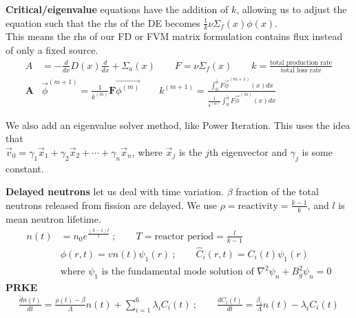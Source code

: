 \documentclass[12pt]{article}
\newcommand{\ve}[1]{\ensuremath{\mathbf{#1}}}
\begin{document}
\textbf{Critical/eigenvalue} equations have the addition of $k$, allowing us to adjust the equation such that the rhs of the DE becomes $\frac{1}{k}\nu \Sigma_f(x) \phi(x)$. \\
This means the rhs of our FD or FVM matrix formulation contains flux instead of only a fixed source. 
\vspace*{-1.25em}
\begin{align*}
A &= -\frac{d}{dx}D(x)\frac{d}{dx} + \Sigma_a(x) \qquad F = \nu\Sigma_f(x) \qquad k = \frac{\text{total production rate}}{\text{total loss rate}}\\
%
\ve{A} &\vec{\phi}^{(m+1)} = \frac{1}{k^{(m)}}\ve{F}\vec{\phi^{(m)}} \qquad 
k^{(m+1)} = \frac{\int_0^{\tilde{a}} F \vec{\phi}^{(m+1)}(x)dx}{\frac{1}{k^{(m)}}\int_0^{\tilde{a}} F \vec{\phi}^{(m)}(x)dx}
\end{align*}

\vspace*{-1.5em}
We also add an eigenvalue solver method, like Power Iteration. This uses the idea that \\$\vec{v}_0 = \gamma_1 \vec{x}_1 + \gamma_2 \vec{x}_2 + \cdots + \gamma_n \vec{x}_n$, where $\vec{x}_{j}$ is the $j$th eigenvector and $\gamma_{j}$ is some constant.

\textbf{Delayed neutrons} let us deal with time variation. $\beta$ fraction of the total neutrons released from fission are delayed. We use $\rho =\mbox{reactivity} = \frac{k-1}{k}$, and $l$ is mean neutron lifetime. 
\begin{align*}
  n(t) &= n_0e^{\frac{(k-1)t}{l}}\:; \qquad T = \text{reactor period} = \frac{l}{k-1}\\
  &\phi(r,t) = vn(t)\psi_1(r)\:; \qquad
  \hat{C}_i(r,t) = C_i(t)\psi_1(r)\\
  &\text{where $\psi_1$ is the fundamental mode solution of }   \nabla^2\psi_n + B_g^2\psi_n = 0%
\end{align*}
\textbf{PRKE}
\vspace*{-1em}
\begin{align*}
  \frac{dn(t)}{dt} = \frac{\rho(t)-\beta}{\Lambda}n(t) + \sum_{i=1}^{6}\lambda_iC_i(t) \:; \qquad
  \frac{dC_i(t)}{dt} = \frac{\beta_i}{\Lambda}n(t) - \lambda_i C_i(t)
 \end{align*}
 
\end{document}
